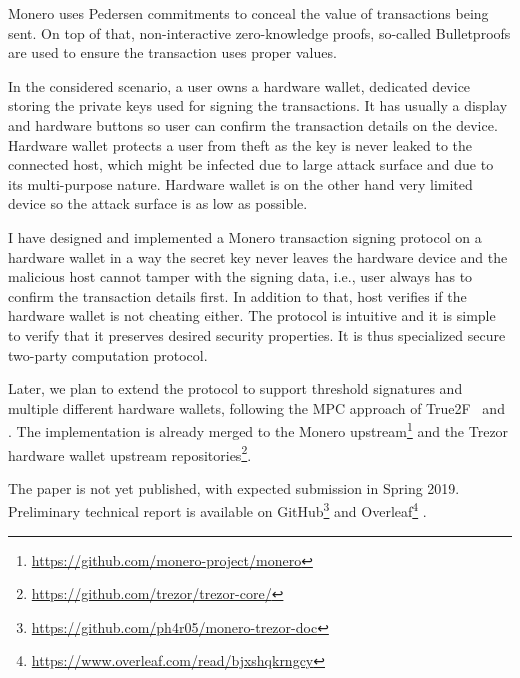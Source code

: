 \documentclass[
  digital, %
  twoside, %
  table,   %
  lof,     %
  lot,     %
]{fithesis3}
\newcounter{ph4_show_guides}
\theoremstyle{definition}
\theoremstyle{remark}
\begin{document}
Monero uses Pedersen commitments to conceal the value of transactions being sent. On top of that, non-interactive zero-knowledge proofs, so-called Bulletproofs \cite{Bnz2017BulletproofsSP2} are used to ensure the transaction uses proper values.

In the considered scenario, a user owns a hardware wallet, dedicated device storing the private keys used for signing the transactions. It has usually a display and hardware buttons so user can confirm the transaction details on the device. Hardware wallet protects a user from theft as the key is never leaked to the connected host, which might be infected due to large attack surface and due to its multi-purpose nature. Hardware wallet is on the other hand very limited device so the attack surface is as low as possible. 

I have designed and implemented a Monero transaction signing protocol on a hardware wallet in a way the secret key never leaves the hardware device and the malicious host cannot tamper with the signing data, i.e., user always has to confirm the transaction details first. In addition to that, host verifies if the hardware wallet is not cheating either. The protocol is intuitive and it is simple to verify that it preserves desired security properties. It is thus specialized secure two-party computation protocol. 

Later, we plan to extend the protocol to support threshold signatures and multiple different hardware wallets, following the MPC approach of True2F~\cite{DCMBR18} and 
\cite{2017-ccs-mavroudis}. The implementation is already merged to the Monero upstream\footnote{\url{https://github.com/monero-project/monero}} and the Trezor hardware wallet upstream repositories\footnote{\url{https://github.com/trezor/trezor-core/}}.

The paper is not yet published, with expected submission in Spring 2019. 
Preliminary technical report is available on GitHub\footnote{\url{https://github.com/ph4r05/monero-trezor-doc}} and Overleaf\footnote{\url{https://www.overleaf.com/read/bjxshqkrngcy}} \cite{trezor_monero_tech}.
\end{document}
